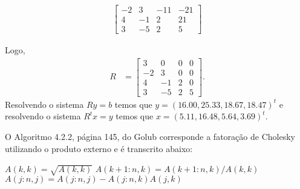 \begin{questions}
\begin{solution}
\begin{enumerate}
\begin{align*}
\begin{bmatrix}
                        -2 & 3 & -11 & -21 \\
                        4 & -1 & 2  & 21 \\
                        3 & -5 & 2 & 5
                    \end{bmatrix}
               \end{align*}
        \end{enumerate}
        Logo,
        \begin{align*}
            R &= \begin{bmatrix}
                3 & 0 & 0 & 0 \\
                -2 & 3 & 0 & 0 \\
                4 & -1 & 2  & 0\\
                3 & -5 & 2 & 5
            \end{bmatrix}.
        \end{align*}
        Resolvendo o sistema $R y = b$ temos que $y = (16.00, 25.33, 18.67, 18.47)^t$ e resolvendo o sistema $R^t x = y$ temos que $x = (5.11, 16.48, 5.64, 3.69)^t$.
        
        O Algoritmo 4.2.2, p\'{a}gina 145, do Golub\nocite{Golub:1996:matrix} corresponde a fatora\c{c}\~{a}o de Cholesky utilizando o produto externo e \'{e} transcrito abaixo:
        \begin{algorithmic}
                \State $A(k,k) = \sqrt{A(k,k)}$
                \State $A(k + 1:n, k) = A(k + 1:n, k) / A(k,k)$
                    \State $A(j:n, j) = A(j:n, j) - A(j:n, k) A(j, k)$
                \EndFor
            \EndFor
        \end{algorithmic}


\end{solution}
\end{questions}
